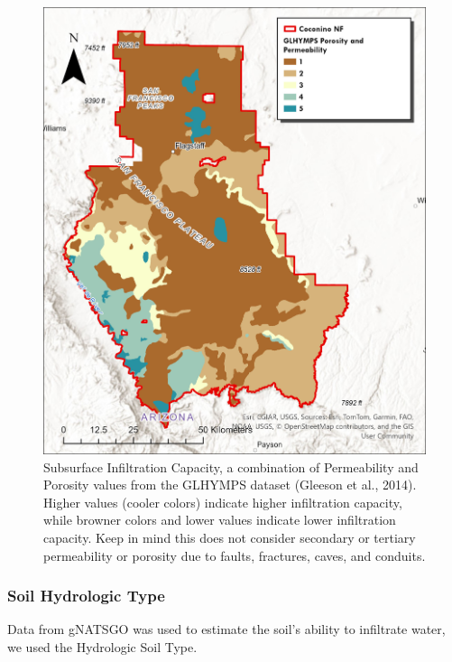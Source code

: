 \documentclass[
  number]{elsarticle}
\begin{document}
\begin{figure}[H]

{\centering \includegraphics{images/GLHYMPS.jpg}

}

\caption{Subsurface Infiltration Capacity, a combination of Permeability
and Porosity values from the GLHYMPS dataset (Gleeson et al., 2014).
Higher values (cooler colors) indicate higher infiltration capacity,
while browner colors and lower values indicate lower infiltration
capacity. Keep in mind this does not consider secondary or tertiary
permeability or porosity due to faults, fractures, caves, and conduits.}

\end{figure}%

\subsubsection{Soil Hydrologic Type}\label{soil-hydrologic-type}

Data from gNATSGO was used to estimate the soil's ability to infiltrate
water, we used the Hydrologic Soil Type.
\end{document}
